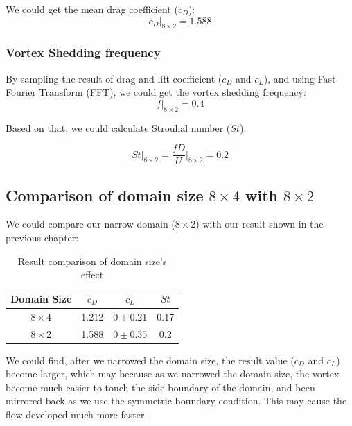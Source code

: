 \documentclass[12pt]{article}
\begin{document}
We could get the mean drag coefficient ($c_D$):
$$c_D\vert_{8 \times 2} = 1.588$$


\subsubsection{Vortex Shedding frequency}

By sampling the result of drag and lift coefficient ($c_D$ and $c_L$), and using Fast Fourier Transform (FFT), we could get the vortex shedding frequency:
$$f\vert_{8 \times 2} = 0.4$$

Based on that, we could calculate Strouhal number ($St$):

$$St\vert_{8 \times 2} = \frac{f D}{U}\vert_{8 \times 2} = 0.2 $$


\subsection{Comparison of domain size $8 \times 4$ with $8 \times 2$}

We could compare our narrow domain ($8 \times 2$) with our result shown in the previous chapter:

\begin{table}[ht]
\centering
\caption{Result comparison of domain size's effect}
\begin{tabular}{c|ccc}
\toprule
Domain Size & $c_D$ & $c_L$ & $St$ \\
\midrule
$8 \times 4$ & 1.212 & $0 \pm 0.21$ & 0.17 \\
$8 \times 2$ & 1.588 & $0 \pm 0.35$ & 0.2 \\
\bottomrule
\end{tabular}
\end{table}

We could find, after we narrowed the domain size, the result value ($c_D$ and $c_L$) become larger, which may because as we narrowed the domain size, the vortex become much easier to touch the side boundary of the domain, and been mirrored back as we use the symmetric boundary condition. This may cause the flow developed much more faster. 

















\newpage
\end{document}
